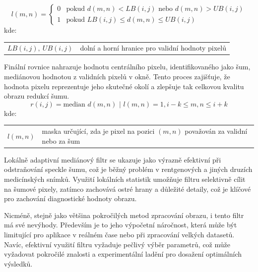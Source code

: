 \documentclass[male,czech,api_ing]{thesis}
\makeatletter
\newenvironment{conditions}[1][kde:]
    {#1 \begin{tabular}[t]{>{$}l<{$} @{${}={}$} >{\raggedright\arraybackslash}p{10cm}}}
    {\end{tabular}}
\makeatother
\begin{document}
\begin{equation}
    l(m, n) = 
    \begin{cases} 
        0 & \text{pokud } d(m, n) < LB(i, j) \text{ nebo } d(m, n) > UB(i, j) \\
        1 & \text{pokud } LB(i, j) \leq d(m, n) \leq UB(i, j)
    \end{cases}
\end{equation}
\begin{conditions}
    LB(i, j), \ UB(i, j) & dolní a horní hranice pro validní hodnoty pixelů
\end{conditions}

Finální rovnice nahrazuje hodnotu centrálního pixelu, identifikovaného jako šum, mediánovou hodnotou z validních pixelů v okně. Tento proces zajišťuje, že hodnota pixelu reprezentuje jeho skutečné okolí a zlepšuje tak celkovou kvalitu obrazu redukcí šumu.
\begin{equation}
    r(i, j) = \text{median } d(m, n) \text{ | } l(m, n) = 1, i-k \le m, n \le i+k
\end{equation}
\begin{conditions}
    l(m, n) & maska určující, zda je pixel na pozici $(m, n)$ považován za validní nebo za šum
\end{conditions}

Lokálně adaptivní mediánový filtr se ukazuje jako výrazně efektivní při odstraňování speckle šumu, což je běžný problém v rentgenových a jiných druzích medicínských snímků. Využití lokálních statistik umožňuje filtru selektivně cílit na šumové pixely, zatímco zachovává ostré hrany a důležité detaily, což je klíčové pro zachování diagnostické hodnoty obrazu.

Nicméně, stejně jako většina pokročilých metod zpracování obrazu, i tento filtr má své nevýhody. Především je to jeho výpočetní náročnost, která může být limitující pro aplikace v reálném čase nebo při zpracování velkých datasetů. Navíc, efektivní využití filtru vyžaduje pečlivý výběr parametrů, což může vyžadovat pokročilé znalosti a experimentální ladění pro dosažení optimálních výsledků. \cite{LocalAdaptiveMedianFilter}
\end{document}

